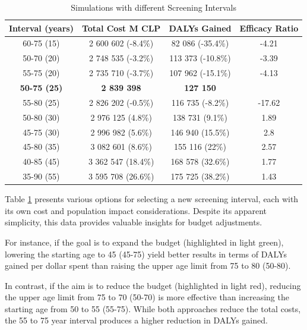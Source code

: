 \begin{table}[H]
\caption{Simulations with different Screening Intervals}
\centering
\begin{tabular}{|c|c|c|c|}
\hline
Interval (years) & Total Cost M CLP & DALYs Gained & Efficacy Ratio\\ \hline
60-75 (15) & 2 600 602 (-8.4\%) & 82 086 (-35.4\%) & -4.21 \\ \hline
\rowcolor{lightred}
50-70 (20) & 2 748 535 (-3.2\%) & 113 373 (-10.8\%) & -3.39 \\ \hline
\rowcolor{lightred}
55-75 (20) & 2 735 710 (-3.7\%) & 107 962 (-15.1\%) & -4.13 \\ \hline
\textbf{50-75 (25)} & \textbf{2 839 398} & \textbf{127 150} &  \\ \hline
55-80 (25) & 2 826 202 (-0.5\%) & 116 735 (-8.2\%) & -17.62 \\ \hline
\rowcolor{lightgreen}
50-80 (30) & 2 976 125 (4.8\%) & 138 731 (9.1\%) & 1.89 \\ \hline
\rowcolor{lightgreen}
45-75 (30) & 2 996 982 (5.6\%) & 146 940 (15.5\%) & 2.8 \\ \hline
45-80 (35) & 3 082 601 (8.6\%) & 155 116 (22\%) & 2.57 \\ \hline
40-85 (45) & 3 362 547 (18.4\%) & 168 578 (32.6\%) & 1.77 \\ \hline
35-90 (55) & 3 595 708 (26.6\%) & 175 725 (38.2\%) & 1.43 \\ \hline
\end{tabular}
\label{table:simulation_intervals}
\end{table}

Table \ref{table:simulation_intervals} presents various options for selecting a new screening interval, each with its own cost and population impact considerations. Despite its apparent simplicity, this data provides valuable insights for budget adjustments.

For instance, if the goal is to expand the budget (highlighted in light green), lowering the starting age to 45 (45-75) yield better results in terms of DALYs gained per dollar spent than raising the upper age limit from 75 to 80 (50-80).

In contrast, if the aim is to reduce the budget (highlighted in light red), reducing the upper age limit from 75 to 70 (50-70) is more effective than increasing the starting age from 50 to 55 (55-75). While both approaches reduce the total costs, the 55 to 75 year interval produces a higher reduction in DALYs gained.

